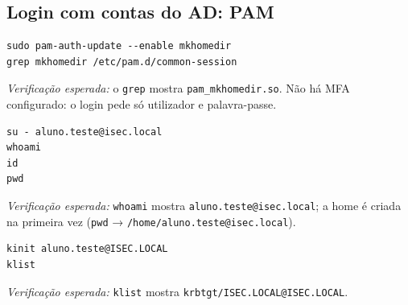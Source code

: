 
\subsection[Login com contas do AD: PAM]{Login com contas do AD: PAM}


\begin{lstlisting}[style=bashstyle]
sudo pam-auth-update --enable mkhomedir
grep mkhomedir /etc/pam.d/common-session
\end{lstlisting}

\emph{Verificação esperada:} o \texttt{grep} mostra \texttt{pam\_mkhomedir.so}. Não há MFA configurado: o login pede só utilizador e palavra-passe.


\begin{lstlisting}[style=bashstyle]
su - aluno.teste@isec.local
whoami
id
pwd
\end{lstlisting}

\emph{Verificação esperada:} \texttt{whoami} mostra \texttt{aluno.teste@isec.local}; a home é criada na primeira vez (\texttt{pwd} → \texttt{/\allowbreak{}home/\allowbreak{}aluno.teste@isec.local}).


\begin{lstlisting}[style=bashstyle]
kinit aluno.teste@ISEC.LOCAL
klist
\end{lstlisting}

\emph{Verificação esperada:} \texttt{klist} mostra \texttt{krbtgt/\allowbreak{}ISEC.LOCAL@ISEC.LOCAL}.

